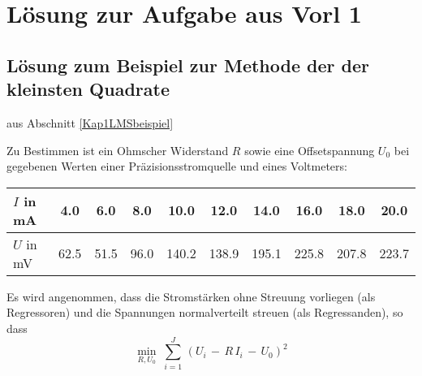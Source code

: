 \section{Lösung zur Aufgabe aus Vorl 1}
\subsection{Lösung zum Beispiel zur Methode der der kleinsten Quadrate}
aus Abschnitt \ref{Kap1LMSbeispiel}

Zu Bestimmen ist ein Ohmscher Widerstand $R$ sowie eine Offsetspannung $U_0$ bei gegebenen Werten einer
Präzisionsstromquelle und eines Voltmeters:

\begin{center}
\begin{tabular}{l||c|c|c|c|c|c|c|c|c}
\hline\hline
 $I$ in mA &    4.0 &     6.0 &     8.0 &    10.0 &    12.0 &    14.0 &    16.0 &    18.0 &    20.0\\
\hline
 $U$ in mV &    62.5 &    51.5 &    96.0 &   140.2 &   138.9 &   195.1 &   225.8 &   207.8 &   223.7 \\
\hline\hline
\end{tabular}
\end{center}

Es wird angenommen, dass die Stromstärken ohne Streuung vorliegen (als Regressoren) und die Spannungen normalverteilt
streuen (als Regressanden), so dass
\begin{equation*}
\min_{R, U_0} \; \sum_{i = 1}^J \, \left(U_i \, - \, R \, I_i  \, - \,  U_0\right)^2
\end{equation*}

